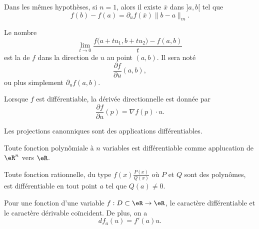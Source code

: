 \begin{corollary}
	Dans les mêmes hypothèses, si \( n=1\), alors il existe \( \bar x \) dans \( ]a,b[\) tel que
	\[
		f(b)-f(a)=\partial_uf(\bar x)\|b-a\|_m.
	\]
\end{corollary}

\begin{definition}
	Le nombre
	\begin{equation}
		\lim_{t\to 0} \frac{ f\big( a+tu_1,b+tu_2 \big)-f(a,b) }{ t }
	\end{equation}
	est la  de \( f\) dans la direction de \( u\) au point \( (a,b)\). Il sera noté
	\begin{equation}
		\frac{ \partial f }{ \partial u }(a,b),
	\end{equation}
	ou plus simplement \( \partial_uf(a,b)\).
\end{definition}

Lorsque \( f\) est différentiable, la dérivée directionnelle est donnée par
\begin{equation}        \label{EqDerDirnablau}
	\frac{ \partial f }{ \partial u }(p)=\nabla f(p)\cdot u.
\end{equation}


\begin{lemma}       \label{LEMooASGNooCWqAmN}
    Les projections canonniques sont des applications différentiables.
\end{lemma}

\begin{lemma}       \label{LEMooGYJUooOudNLH}
    Toute fonction polynômiale à \( n\) variables est différentiable comme applucation de \( \eR^n\) vers \( \eR\).
\end{lemma}

\begin{lemma}       \label{LEMooUMRXooDUQHpK}
		 Toute fonction rationnelle, du type \( f(x)  \frac{P(x)}{Q(x)}\) où \( P\) et \( Q\) sont des polynômes, est
		      différentiable en tout point \( a\) tel que \( Q(a) \neq 0\).
\end{lemma}


\begin{lemma}       \label{LEMooTPDSooGbxfhP}
    Pour une fonction d'une variable \( f : D \subset \eR \to \eR\), le caractère différentiable et le caractère dérivable coïncident. De plus, on a
    \begin{equation}
      d f_a(u) = f'(a) u.
    \end{equation}
\end{lemma}

